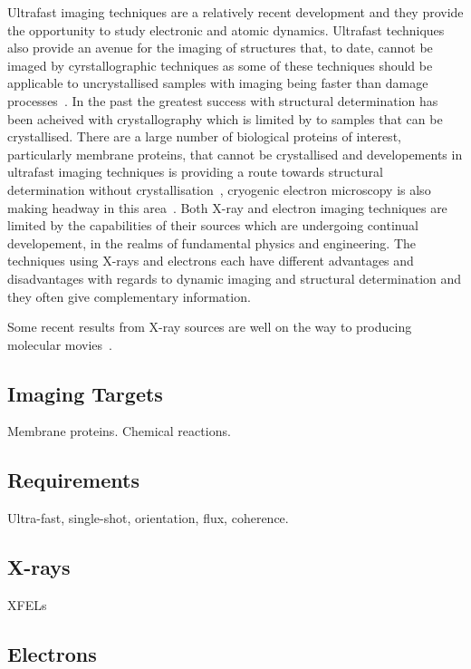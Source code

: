 Ultrafast imaging techniques are a relatively recent development and they provide the opportunity to study electronic and atomic dynamics.
Ultrafast techniques also provide an avenue for the imaging of structures that, to date, cannot be imaged by cyrstallographic techniques as some of these techniques should be applicable to uncrystallised samples with imaging being faster than damage processes~\cite{gaffney_imaging_2007,barty_ultrafast_2008,miao_beyond_2015}.
In the past the greatest success with structural determination has been acheived with crystallography which is limited by to samples that can be crystallised.
There are a large number of biological proteins of interest, particularly membrane proteins, that cannot be crystallised and developements in ultrafast imaging techniques is providing a route towards structural determination without crystallisation~\cite{dauter_current_2006,levitt_nature_2009}, cryogenic electron microscopy is also making headway in this area~\cite{henderson_model_1990,zhou_towards_2008}.
Both X-ray and electron imaging techniques are limited by the capabilities of their sources which are undergoing continual developement, in the realms of fundamental physics and engineering.
The techniques using X-rays and electrons each have different advantages and disadvantages with regards to dynamic imaging and structural determination and they often give complementary information.

Some recent results from X-ray sources are well on the way to producing molecular movies~\cite{pande_femtosecond_2016,nango_three-dimensional_2016}.

\subsection{Imaging Targets}

Membrane proteins.
Chemical reactions.


\subsection{Requirements}

Ultra-fast, single-shot, orientation, flux, coherence.

\subsection{X-rays}

XFELs

\subsection{Electrons}

